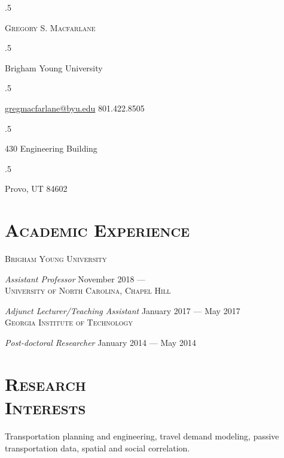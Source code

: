 \documentclass[margin,line]{res}
\newcommand{\secfont}{\scshape }
\newcommand{\acc}{\scshape }
\begin{document}
 \moveleft.5\hoffset\centerline{\LARGE\scshape Gregory S.  Macfarlane}
\vspace{.05in}
 \moveleft.5\hoffset\centerline{Brigham Young University}
 \moveleft.5\hoffset\centerline{
	 \href{mailto:gregmacfarlane@byu.edu}{gregmacfarlane@byu.edu}
   801.422.8505}
\vspace{.05in}
 \moveleft.5\hoffset\centerline{430 Engineering Building}
 \moveleft.5\hoffset\centerline{Provo, UT 84602}

\begin{resume}

\vspace{.05in}

\section{\secfont Academic Experience}

{\acc Brigham Young University}

\vspace{-.4cm}
\textit{Assistant Professor} \hfill {November 2018 --- }\\

\vspace{-.4cm}
{\acc University of North Carolina, Chapel Hill}

\vspace{-.4cm}
\textit{Adjunct Lecturer/Teaching Assistant} \hfill {January 2017 --- May 2017}\\

\vspace{-.4cm}
{\acc Georgia Institute of Technology}

\vspace{-.4cm}
\textit{Post-doctoral Researcher} \hfill {January 2014 --- May 2014}\\

\vspace{-.4cm}
\section{\secfont Research\\ Interests}
Transportation planning and engineering, travel demand modeling,
passive transportation data, spatial and social correlation.



\end{resume}
\end{document}
